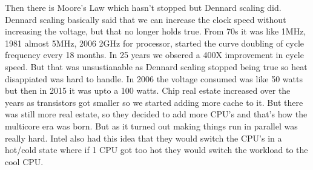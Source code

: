 \documentclass[twoside]{article}
\begin{document}
Then there is Moore's Law which hasn't stopped but Dennard scaling did. Dennard scaling basically said that we can increase the clock speed without increasing the voltage, but that no longer holds true. From 70s it was like 1MHz, 1981 almost 5MHz, 2006 2GHz for processor, started the curve doubling of cycle frequency every 18 months. In 25 years we obsered a 400X improvement in cycle speed. But that was unsustianable as Dennard scaling stopped being true so heat disappiated was hard to handle. In 2006 the voltage consumed was like 50 watts but then in 2015 it was upto a 100 watts.  Chip real estate increased over the years as transistors got smaller so we started adding more cache to it. But there was still more real estate, so they decided to add more CPU's and that's how the multicore era was born. But as it turned out making things run in parallel was really hard. Intel also had this idea that they would switch the CPU's in a hot/cold state where if 1 CPU got too hot they would switch the workload to the cool CPU.
\end{document}
